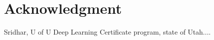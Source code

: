 \documentclass[journal]{IEEEtran}
\begin{document}
\section*{Acknowledgment}


Sridhar, U of U Deep Learning Certificate program, state of Utah.... 


\ifCLASSOPTIONcaptionsoff
  \newpage
\fi





%
%
%


{\small


}
% 
\end{document}
